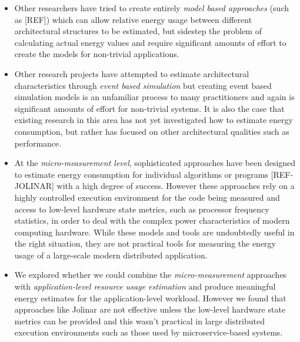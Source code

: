 \begin{itemize}
\item Other researchers have tried to create entirely \emph{model based approaches} (such as [REF]) which can allow relative energy usage between different architectural structures to be estimated, but sidestep the problem of calculating actual energy values and require significant amounts of effort to create the models for non-trivial applications.

\item Other research projects have attempted to estimate architectural characteristics through \emph{event based simulation} but creating event based simulation models is an unfamiliar process to many practitioners and again is significant amounts of effort for non-trivial systems.  It is also the case that existing research in this area has not yet investigated how to estimate energy consumption, but rather has focused on other architectural qualities such as performance.

\item At the \emph{micro-measurement level}, sophisticated approaches have been designed to estimate energy consumption for individual algorithms or programs [REF-JOLINAR] with a high degree of success.  However these approaches rely on a highly controlled execution environment for the code being measured and access to low-level hardware state metrics, such as processor frequency statistics, in order to deal with the complex power characteristics of modern computing hardware.  While these models and tools are undoubtedly useful in the right situation, they are not practical tools for measuring the energy usage of a large-scale modern distributed application.

\item We explored whether we could combine the \emph{micro-measurement} approaches with \emph{application-level resource usage estimation} and produce meaningful energy estimates for the application-level workload.  However we found that approaches like Jolinar are not effective unless the low-level hardware state metrics can be provided and this wasn't practical in large distributed execution environments such as those used by microservice-based systems.

\end{itemize}

